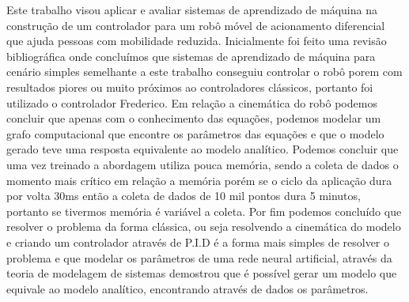 
\label{Cap:Conclusao}

Este trabalho visou aplicar e avaliar sistemas de aprendizado de máquina
na construção de um controlador para um robô móvel de acionamento diferencial
que ajuda pessoas com mobilidade reduzida. Inicialmente foi feito uma
revisão bibliográfica onde concluímos que sistemas de aprendizado de
máquina para cenário simples semelhante a este trabalho conseguiu
controlar o robô porem com resultados piores ou muito próximos ao
controladores clássicos, portanto foi utilizado o controlador Frederico.
Em relação a cinemática do robô podemos concluir que apenas com o
conhecimento das equações, podemos modelar um grafo computacional
que encontre os parâmetros das equações e que o modelo gerado teve
uma resposta equivalente ao modelo analítico. Podemos concluir que
uma vez treinado a abordagem utiliza pouca memória, sendo
a coleta de dados o momento mais crítico em relação a memória porém
se o ciclo da aplicação dura por volta 30ms então a coleta de dados
de 10 mil pontos dura 5 minutos, portanto se tivermos memória 
é variável a coleta. Por fim podemos concluído que resolver o problema
da forma clássica, ou seja resolvendo a cinemática do modelo e criando
um controlador através de P.I.D é a forma mais simples de resolver o
problema e que modelar os parâmetros de uma rede neural artificial,
através da teoria de modelagem de sistemas demostrou que é possível
gerar um modelo que equivale ao modelo analítico, encontrando através
de dados os parâmetros. 